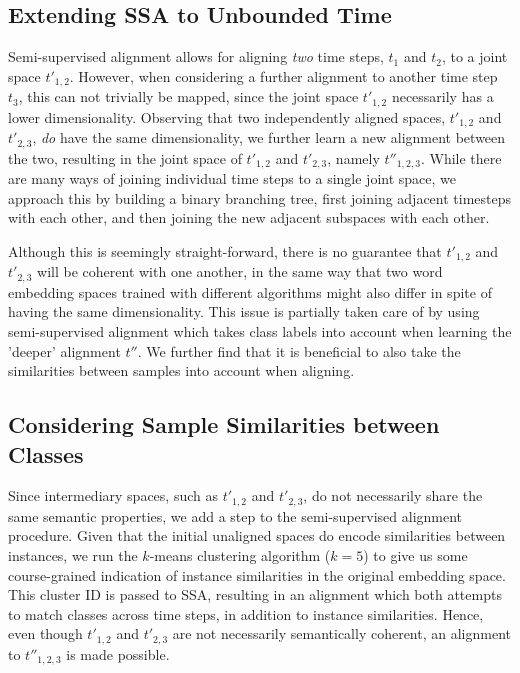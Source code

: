 \documentclass[letterpaper]{article} %
\begin{document}
\subsection{Extending SSA to Unbounded Time}
Semi-supervised alignment allows for aligning \emph{two} time steps, $t_1$ and $t_2$, to a joint space $t'_{1,2}$.
However, when considering a further alignment to another time step $t_3$, this can not trivially be mapped, since the joint space $t'_{1,2}$ necessarily has a lower dimensionality.
Observing that two independently aligned spaces, $t'_{1,2}$ and $t'_{2,3}$, \emph{do} have the same dimensionality, we further learn a new alignment between the two, resulting in the joint space of $t'_{1,2}$ and $t'_{2,3}$, namely $t''_{1,2,3}$.
While there are many ways of joining individual time steps to a single joint space, we approach this by building a binary branching tree, first joining adjacent timesteps with each other, and then joining the new adjacent subspaces with each other.

Although this is seemingly straight-forward, there is no guarantee that $t'_{1,2}$ and $t'_{2,3}$ will be coherent with one another, in the same way that two word embedding spaces trained with different algorithms might also differ in spite of having the same dimensionality.
This issue is partially taken care of by using semi-supervised alignment which takes class labels into account when learning the 'deeper' alignment $t''$.
We further find that it is beneficial to also take the similarities between samples into account when aligning.

\subsection{Considering Sample Similarities between Classes}

Since intermediary spaces, such as  $t'_{1,2}$ and $t'_{2,3}$, do not necessarily share the same semantic properties, we add a step to the semi-supervised alignment procedure.
Given that the initial unaligned spaces do encode similarities between instances, we run the $k$-means clustering algorithm ($k=5$) to give us some course-grained indication of instance similarities in the original embedding space.
This cluster ID is passed to SSA, resulting in an alignment which both attempts to match classes across time steps, in addition to instance similarities.
Hence, even though $t'_{1,2}$ and $t'_{2,3}$ are not necessarily semantically coherent, an alignment to $t''_{1,2,3}$ is made possible.
\end{document}
